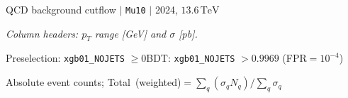 \documentclass[10pt,a4paper]{article}
\begin{document}
\begin{landscape}

{\large QCD background cutflow $|$ \texttt{Mu10} $|$ 2024, $13.6\,\mathrm{TeV}$}

\vspace{0.8em}

\textit{Column headers: $p_T$ range [GeV] and $\sigma$ [pb].}

Preselection: \texttt{xgb01\_NOJETS} $\geq 0$\quad BDT: \texttt{xgb01\_NOJETS} $>0.9969$ (FPR$=10^{-4}$)

\vspace{0.8em}

\vspace{18pt}

Absolute event counts; Total\ (weighted)$=\sum_q(\sigma_q N_q)/\sum_q\sigma_q$


\end{landscape}
\end{document}
